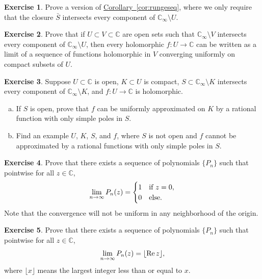 \documentclass[12pt,openany]{book}
\newcommand{\avoidbreak}{\postdisplaypenalty=100}
\renewcommand{\Re}{\operatorname{Re}}
\newcommand{\C}{{\mathbb{C}}}
\theoremstyle{plain}
\theoremstyle{remark}
\theoremstyle{definition}
\newenvironment{exbox}{%
    \def\FrameCommand{\vrule width 1pt \relax\hspace{10pt}}%
    \MakeFramed{\advance\hsize-\width\FrameRestore}%
}{%
    \endMakeFramed
}
\newenvironment{exparts}{%
    \leavevmode\begin{enumerate}[a),noitemsep,topsep=0pt,parsep=0pt,partopsep=0pt]
}{%
    \end{enumerate}
}
\theoremstyle{exercise}
\newtheorem{exercise}{Exercise}[section]
\theoremstyle{example}
\newcommand{\corref}[1]{\hyperref[#1]{Corollary~\ref*{#1}}}
\begin{document}
\begin{exbox}
\begin{exercise}
Prove a version of \corref{cor:rungeseq}, where we only require that the
closure $\bar{S}$ intersects every component of $\C_\infty \setminus U$.
\end{exercise}

\begin{exercise}
Prove that if $U \subset V \subset \C$ are open sets such that
$\C_\infty \setminus V$ intersects every component of
$\C_\infty \setminus U$, then every holomorphic $f \colon U \to \C$
can be written as a limit of a sequence of functions holomorphic in $V$
converging uniformly on compact subsets of $U$.
\end{exercise}

\begin{exercise}
Suppose $U \subset \C$ is open, $K \subset U$ is compact, $S \subset
\C_\infty \setminus K$ intersects every component of $\C_\infty \setminus K$,
and $f \colon U \to \C$ is holomorphic.
\begin{exparts}
\item
If $S$ is open,
prove that $f$ can be uniformly approximated on $K$ by a rational function
with only simple poles in $S$.
\item
Find an example $U$, $K$, $S$, and $f$, where $S$ is not open and
$f$ cannot be approximated by a rational functions with only simple poles
in $S$.
\end{exparts}
\end{exercise}

\begin{exercise}
Prove that there exists a sequence of polynomials $\{ P_n \}$ such that
pointwise
for all $z \in \C$,
\begin{equation*}
\lim_{n \to \infty}
P_n(z) =
\begin{cases}
1 & \text{if } z = 0, \\
0 & \text{else.}
\end{cases}
\avoidbreak
\end{equation*}
Note that the convergence will not be uniform in any neighborhood of the
origin.
\end{exercise}

\begin{exercise}
Prove that there exists a sequence of polynomials $\{ P_n \}$ such that
pointwise
for all $z \in \C$,
\begin{equation*}
\lim_{n \to \infty}
P_n(z) = \lfloor \Re z \rfloor ,
\avoidbreak
\end{equation*}
where $\lfloor x \rfloor$ means the largest integer less than or equal to
$x$. 
\end{exercise}


\end{exbox}
\end{document}
